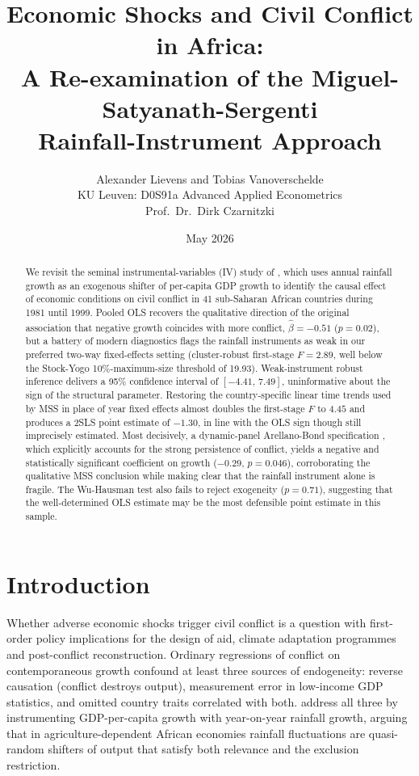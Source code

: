 \documentclass[11pt,a4paper]{article}
\title{\textbf{Economic Shocks and Civil Conflict in Africa:\\
       A Re-examination of the Miguel-Satyanath-Sergenti\\
       Rainfall-Instrument Approach}}
\author{Alexander Lievens and Tobias Vanoverschelde\\
\small KU Leuven: D0S91a Advanced Applied Econometrics\\
\small Prof.\ Dr.\ Dirk Czarnitzki}
\date{May 2026}
\begin{document}
\maketitle

\begin{abstract}
\noindent
We revisit the seminal instrumental-variables (IV) study of
\citet{MSS2004}, which uses annual rainfall growth as an exogenous
shifter of per-capita GDP growth to identify the causal effect of
economic conditions on civil conflict in 41 sub-Saharan African
countries during 1981 until 1999. Pooled OLS recovers the qualitative
direction of the original association that negative growth coincides
with more conflict, $\hat\beta=-0.51$ ($p=0.02$), but a battery of
modern diagnostics flags the rainfall instruments as weak in our
preferred two-way fixed-effects setting (cluster-robust first-stage
$F=2.89$, well below the Stock-Yogo 10\%-maximum-size threshold of 19.93).
Weak-instrument robust inference \citep{AndersonRubin1949} delivers
a 95\% confidence interval of $[-4.41,\,7.49]$, uninformative about
the sign of the structural parameter. Restoring the country-specific
linear time trends used by MSS in place of year fixed effects almost
doubles the first-stage $F$ to $4.45$ and produces a 2SLS point
estimate of $-1.30$, in line with the OLS sign though still
imprecisely estimated. Most decisively, a dynamic-panel
Arellano-Bond specification \citep{ArellanoBond1991}, which
explicitly accounts for the strong persistence of conflict, yields
a negative and statistically significant coefficient on growth
($-0.29$, $p=0.046$), corroborating the qualitative MSS conclusion
while making clear that the rainfall instrument alone is fragile.
The Wu-Hausman test also fails to reject exogeneity ($p=0.71$),
suggesting that the well-determined OLS estimate may be the most
defensible point estimate in this sample.
\end{abstract}

\section{Introduction}\label{sec:intro}
Whether adverse economic shocks trigger civil conflict is a question
with first-order policy implications for the design of aid, climate
adaptation programmes and post-conflict reconstruction. Ordinary
regressions of conflict on contemporaneous growth confound at least
three sources of endogeneity: reverse causation (conflict destroys
output), measurement error in low-income GDP statistics, and omitted
country traits correlated with both. \citet{MSS2004} address all
three by instrumenting GDP-per-capita growth with year-on-year
rainfall growth, arguing that in agriculture-dependent African
economies rainfall fluctuations are quasi-random shifters of output
that satisfy both relevance and the exclusion restriction.
\end{document}
